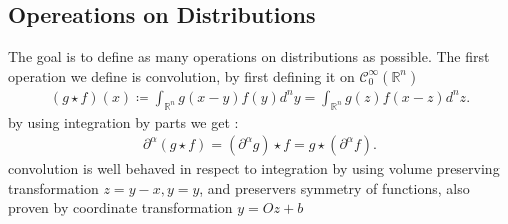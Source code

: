 \subsection{Opereations on Distributions} %
\label{sub:Opereations on Distributions}
The goal is to define as many operations on  distributions as possible.
The first operation we define is convolution, by first defining it on $\mathcal{C}_0^\infty(\mathbb{R}^{n} )$
\begin{align*}
  (g \star f)(x) \coloneqq  \int_{\mathbb{R}^{n } }  g(x-y)f(y) d^{n }y = \int_{\mathbb{R}^{n } }g(z)f(x-z) d^{n} z
.\end{align*}
by using integration by parts we get : 
\begin{align*}
  \partial ^{\alpha }(g \star f) = (\partial ^{\alpha } g ) \star  f = g \star (\partial ^{ \alpha }f ) 
.\end{align*}
convolution is well behaved in respect to integration by using volume preserving transformation $z=y-x , y=y$,
and preservers symmetry of functions, also proven by coordinate transformation $y=Oz+b$



